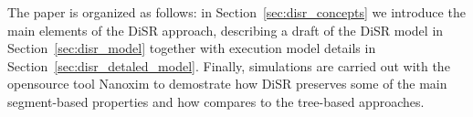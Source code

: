 The paper is organized as follows: in Section~\ref{sec:disr_concepts}
we introduce the main elements of the DiSR approach, describing  
a draft of the DiSR model in Section~\ref{sec:disr_model}
together with execution model details in Section~\ref{sec:disr_detaled_model}.
Finally, simulations are carried out with the opensource tool Nanoxim
to demostrate how DiSR preserves some of the main segment-based
properties and how compares to the tree-based approaches.


